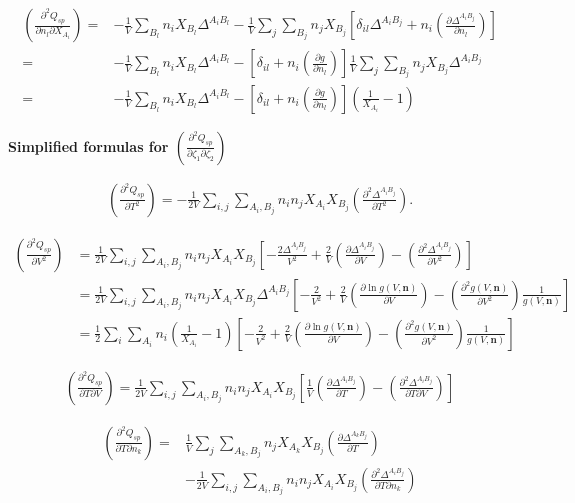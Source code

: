 \documentclass[english]{../thermomemo/thermomemo}
\newcommand{\mbf}[0]{\mathbf}
\newcommand*{\pder}[2]{\left(\frac{\partial #1}{\partial #2}\right)}
\newcommand*{\pdder}[2]{\left(\frac{\partial^2 #1}{\partial #2^2}\right)}
\newcommand*{\pdcross}[3]{\left(\frac{\partial^2 #1}{\partial #2 \partial #3}\right)}
\newcommand{\z}{\zeta}
\newcommand{\lp}{\left(}
\newcommand{\rp}{\right)}
\begin{document}
\begin{align*}
  \pdcross{Q_{sp}}{n_l}{X_{A_i}} =& - \frac{1}{V} \sum_{B_l} n_i X_{B_l} \Delta^{A_i B_l} - \frac{1}{V} \sum_{j} \sum_{B_j} n_j X_{B_j} \left[\delta_{il} \Delta^{A_i B_j} + n_i \pder{\Delta^{A_i B_j}}{n_l} \right] \\
  =& - \frac{1}{V} \sum_{B_l} n_i X_{B_l} \Delta^{A_i B_l} - \left[\delta_{il} + n_i \pder{g}{n_l} \right] \frac{1}{V} \sum_{j} \sum_{B_j} n_j X_{B_j} \Delta^{A_i B_j} \\
  =& - \frac{1}{V} \sum_{B_l} n_i X_{B_l} \Delta^{A_i B_l} - \left[\delta_{il} + n_i \pder{g}{n_l} \right] \lp \frac{1}{X_{A_i}} - 1 \rp
\end{align*}

\textbf{Simplified formulas for $\pdcross{Q_{sp}}{\z_1}{\z_2}$}

\begin{align*}
  \pdder{Q_{sp}}{T} =  - \frac{1}{2V} \sum_{i,j} \sum_{A_i, B_j} n_i n_j X_{A_i} X_{B_j} \pdder{\Delta^{A_i B_j}}{T}.
\end{align*}


\begin{align*} %
  \pdder{Q_{sp}}{V} &= \frac{1}{2V} \sum_{i,j} \sum_{A_i, B_j} n_i n_j X_{A_i} X_{B_j} \left[ -\frac{2\Delta^{A_i B_j}}{V^2} + \frac{2}{V}  \pder{\Delta^{A_i B_j}}{V}  - \pdder{\Delta^{A_i B_j}}{V} \right] \\
  &= \frac{1}{2V} \sum_{i,j} \sum_{A_i, B_j} n_i n_j X_{A_i} X_{B_j} \Delta^{A_i B_j} \left[ -\frac{2}{V^2} + \frac{2}{V} \pder{\ln g(V,\mbf n)}{V} - \pdder{g(V,\mbf n)}{V}  \frac{1}{g(V,\mbf n)} \right] \\
  &= \frac{1}{2} \sum_{i} \sum_{A_i} n_i \lp \frac{1}{X_{A_i}}-1 \rp \left[ -\frac{2}{V^2} + \frac{2}{V} \pder{\ln g(V,\mbf n)}{V} -  \pdder{g(V,\mbf n)}{V}  \frac{1}{g(V,\mbf n)} \right]
\end{align*}


\begin{align*}
  \pdcross{Q_{sp}}{T}{V} = \frac{1}{2V} \sum_{i,j} \sum_{A_i, B_j} n_i n_j X_{A_i} X_{B_j} \left[ \frac{1}{V} \pder{\Delta^{A_i B_j}}{T} - \pdcross{\Delta^{A_i B_j}}{T}{V} \right]
\end{align*}


\begin{align*}
  \pdcross{Q_{sp}}{T}{n_k} =& \frac{1}{V} \sum_{j} \sum_{A_k,B_j} n_j X_{A_k} X_{B_j} \pder{\Delta^{A_k B_j}}{T}\\
  &- \frac{1}{2V} \sum_{i,j} \sum_{A_i, B_j} n_i n_j X_{A_i} X_{B_j} \pdcross{\Delta^{A_i B_j}}{T}{n_k}
\end{align*}
\end{document}
